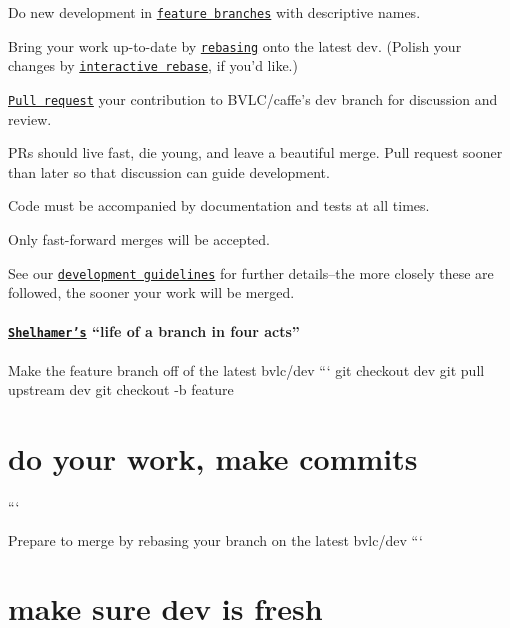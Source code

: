 \begin{DoxyItemize}
\item Do new development in \href{https://www.atlassian.com/git/workflows#!workflow-feature-branch}{\tt feature branches} with descriptive names.
\item Bring your work up-\/to-\/date by \href{http://git-scm.com/book/en/Git-Branching-Rebasing}{\tt rebasing} onto the latest {\ttfamily dev}. (Polish your changes by \href{https://help.github.com/articles/interactive-rebase}{\tt interactive rebase}, if you'd like.)
\item \href{https://help.github.com/articles/using-pull-requests}{\tt Pull request} your contribution to B\+V\+L\+C/caffe's {\ttfamily dev} branch for discussion and review.
\begin{DoxyItemize}
\item P\+Rs should live fast, die young, and leave a beautiful merge. Pull request sooner than later so that discussion can guide development.
\item Code must be accompanied by documentation and tests at all times.
\item Only fast-\/forward merges will be accepted.
\end{DoxyItemize}
\end{DoxyItemize}

See our \href{http://caffe.berkeleyvision.org/development.html}{\tt development guidelines} for further details–the more closely these are followed, the sooner your work will be merged.

\paragraph*{\href{https://github.com/shelhamer}{\tt Shelhamer's} “life of a branch in four acts”}

Make the {\ttfamily feature} branch off of the latest {\ttfamily bvlc/dev} ``` git checkout dev git pull upstream dev git checkout -\/b feature \section*{do your work, make commits}

```

Prepare to merge by rebasing your branch on the latest {\ttfamily bvlc/dev} ``` \section*{make sure dev is fresh}


